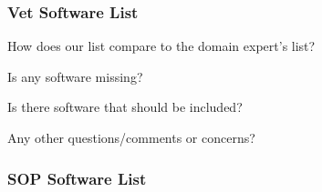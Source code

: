 \documentclass[t,12pt,numbers,fleqn]{beamer}
\begin{document}

\begin{frame}
\frametitle{Vet Software List}

\bi
\item How does our list compare to the domain expert's list?
\item Is any software missing?
\item Is there software that should be included?
\item Any other questions/comments or concerns?  
\ei
  
\end{frame}


\begin{frame}
\frametitle{SOP Software List}


\end{frame}
\end{document}
